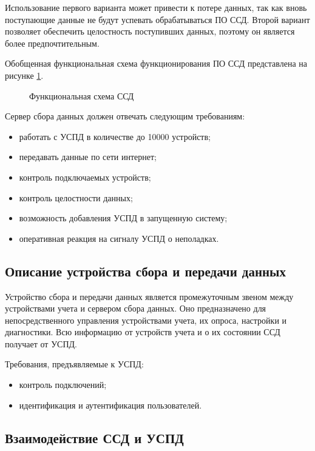Использование первого варианта может привести к потере данных, так как вновь поступающие данные не будут успевать обрабатываться ПО ССД. Второй вариант позволяет обеспечить целостность поступивших данных, поэтому он является более предпочтительным.

Обобщенная функциональная схема функционирования ПО ССД представлена на рисунке \ref{fs_ssd:fs_ssd}.

\begin{figure}[!ht]
 \caption{Функциональная схема ССД}
 \label{fs_ssd:fs_ssd}
\end{figure}

Сервер сбора данных должен отвечать следующим требованиям:

\begin{itemize}
 \item работать с УСПД в количестве до 10000 устройств;
 \item передавать данные по сети интернет;
 \item контроль подключаемых устройств;
 \item контроль целостности данных;
 \item возможность добавления УСПД в запущенную систему;
 \item оперативная реакция на сигналу УСПД о неполадках.
\end{itemize}

\newpage
\subsection{Описание устройства сбора и передачи данных}%

Устройство сбора и передачи данных является промежуточным звеном между устройствами учета и сервером сбора данных. Оно предназначено для непосредственного управления устройствами учета, их опроса, настройки и диагностики. Всю информацию от устройств учета и о их состоянии ССД получает от УСПД.

Требования, предъявляемые к УСПД:

\begin{itemize}
 \item контроль подключений;
 \item идентификация и аутентификация пользователей.
\end{itemize}



\subsection{Взаимодействие ССД и УСПД}

